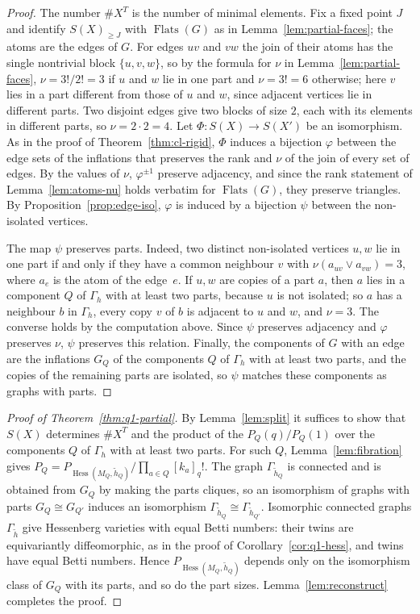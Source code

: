 \documentclass[11pt,a4paper]{article}
\numberwithin{equation}{section}
\theoremstyle{plain}
\theoremstyle{definition}
\theoremstyle{remark}
\DeclareMathOperator{\Hess}{Hess}
\DeclareMathOperator{\Flats}{Flats}
\begin{document}
\begin{proof}
The number $\#X^T$ is the number of minimal elements. Fix a fixed point $J$ and identify $S(X)_{\geqslant J}$ with $\Flats(G)$ as in Lemma~\ref{lem:partial-faces}; the atoms are the edges of $G$. For edges $uv$ and $vw$ the join of their atoms has the single nontrivial block $\{u,v,w\}$, so by the formula for $\nu$ in Lemma~\ref{lem:partial-faces}, $\nu=3!/2!=3$ if $u$ and $w$ lie in one part and $\nu=3!=6$ otherwise; here $v$ lies in a part different from those of $u$ and $w$, since adjacent vertices lie in different parts. Two disjoint edges give two blocks of size $2$, each with its elements in different parts, so $\nu=2\cdot2=4$. Let $\Phi\colon S(X)\to S(X')$ be an isomorphism. As in the proof of Theorem~\ref{thm:cl-rigid}, $\Phi$ induces a bijection $\varphi$ between the edge sets of the inflations that preserves the rank and $\nu$ of the join of every set of edges. By the values of $\nu$, $\varphi^{\pm1}$ preserve adjacency, and since the rank statement of Lemma~\ref{lem:atoms-nu} holds verbatim for $\Flats(G)$, they preserve triangles. By Proposition~\ref{prop:edge-iso}, $\varphi$ is induced by a bijection $\psi$ between the non-isolated vertices.

The map $\psi$ preserves parts. Indeed, two distinct non-isolated vertices $u,w$ lie in one part if and only if they have a common neighbour $v$ with $\nu(a_{uv}\vee a_{vw})=3$, where $a_e$ is the atom of the edge~$e$. If $u,w$ are copies of a part $a$, then $a$ lies in a component $Q$ of $\Gamma_h$ with at least two parts, because $u$ is not isolated; so $a$ has a neighbour $b$ in $\Gamma_h$, every copy $v$ of $b$ is adjacent to $u$ and $w$, and $\nu=3$. The converse holds by the computation above. Since $\psi$ preserves adjacency and $\varphi$ preserves $\nu$, $\psi$ preserves this relation. Finally, the components of $G$ with an edge are the inflations $G_Q$ of the components $Q$ of $\Gamma_h$ with at least two parts, and the copies of the remaining parts are isolated, so $\psi$ matches these components as graphs with parts.
\end{proof}

\begin{proof}[Proof of Theorem~\ref{thm:q1-partial}]
By Lemma~\ref{lem:split} it suffices to show that $S(X)$ determines $\#X^T$ and the product of the $P_Q(q)/P_Q(1)$ over the components $Q$ of $\Gamma_h$ with at least two parts. For such $Q$, Lemma~\ref{lem:fibration} gives $P_Q=P_{\Hess(M_Q,\tilde h_Q)}/\prod_{a\in Q}[k_a]_q!$. The graph $\Gamma_{\tilde h_Q}$ is connected and is obtained from $G_Q$ by making the parts cliques, so an isomorphism of graphs with parts $G_Q\cong G_{Q'}$ induces an isomorphism $\Gamma_{\tilde h_Q}\cong\Gamma_{\tilde h_{Q'}}$. Isomorphic connected graphs $\Gamma_{\tilde h}$ give Hessenberg varieties with equal Betti numbers: their twins are equivariantly diffeomorphic, as in the proof of Corollary~\ref{cor:q1-hess}, and twins have equal Betti numbers. Hence $P_{\Hess(M_Q,\tilde h_Q)}$ depends only on the isomorphism class of $G_Q$ with its parts, and so do the part sizes. Lemma~\ref{lem:reconstruct} completes the proof.
\end{proof}
\end{document}
